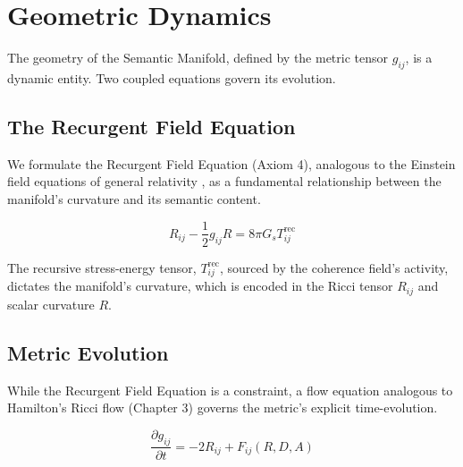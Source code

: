 
\section{Geometric Dynamics}
\label{10.3:geometric_dynamics}

The geometry of the Semantic Manifold, defined by the metric tensor \(g_{ij}\), is a dynamic entity. Two coupled equations govern its evolution.


\subsection{The Recurgent Field Equation}
\label{10.3.1:the_recurgent_field_equation}

We formulate the Recurgent Field Equation (Axiom 4), analogous to the Einstein field equations of general relativity \autocite{Einstein1915}, as a fundamental relationship between the manifold's curvature and its semantic content.

\begin{equation}
R_{ij} - \frac{1}{2}g_{ij}R = 8\pi G_s T^{\text{rec}}_{ij}
\end{equation}

The recursive stress-energy tensor, \(T^{\text{rec}}_{ij}\), sourced by the coherence field's activity, dictates the manifold's curvature, which is encoded in the Ricci tensor \(R_{ij}\) and scalar curvature \(R\).


\subsection{Metric Evolution}
\label{10.3.2:metric_evolution}

While the Recurgent Field Equation is a constraint, a flow equation analogous to Hamilton's Ricci flow (Chapter 3) \autocite{Hamilton1982} governs the metric's explicit time-evolution.

\begin{equation}
\frac{\partial g_{ij}}{\partial t} = -2 R_{ij} + F_{ij}(R, D, A)
\end{equation}

